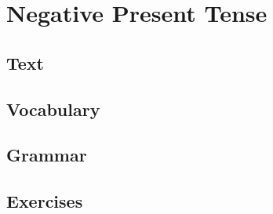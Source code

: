 \chapter{Negative Present Tense}
\section*{Text}
\section*{Vocabulary}
\section*{Grammar}
\section*{Exercises}
